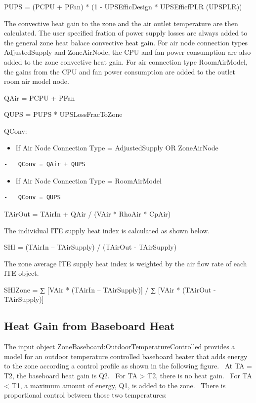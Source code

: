 PUPS = (PCPU + PFan) * (1 - UPSEfficDesign * UPSEfficfPLR (UPSPLR))

The convective heat gain to the zone and the air outlet temperature are then calculated. The user specified fration of power supply losses are always added to the general zone heat balace convective heat gain. For air node connection types AdjustedSupply and ZoneAirNode, the CPU and fan power consumption are also added to the zone convective heat gain. For air connection type RoomAirModel, the gains from the CPU and fan power consumption are added to the outlet room air model node.

QAir = PCPU + PFan

QUPS = PUPS * UPSLossFracToZone

QConv:

\begin{itemize}
\tightlist
\item
  If Air Node Connection Type = AdjustedSupply OR ZoneAirNode
\end{itemize}

\begin{lstlisting}
-   QConv = QAir + QUPS
\end{lstlisting}

\begin{itemize}
\tightlist
\item
  If Air Node Connection Type = RoomAirModel
\end{itemize}

\begin{lstlisting}
-   QConv = QUPS
\end{lstlisting}

TAirOut = TAirIn + QAir / (VAir * RhoAir * CpAir)

The individual ITE supply heat index is calculated as shown below.

SHI = (TAirIn -- TAirSupply) / (TAirOut - TAirSupply)

The zone average ITE supply heat index is weighted by the air flow rate of each ITE object.

SHIZone = ∑ {[}VAir * (TAirIn -- TAirSupply){]} / ∑ {[}VAir * (TAirOut - TAirSupply){]}

\subsection{Heat Gain from Baseboard Heat}\label{heat-gain-from-baseboard-heat}

The input object ZoneBaseboard:OutdoorTemperatureControlled provides a model for an outdoor temperature controlled baseboard heater that adds energy to the zone according a control profile as shown in the following figure.~ At TA = T2, the baseboard heat gain is Q2.~ For TA \textgreater{} T2, there is no heat gain.~ For TA \textless{} T1, a maximum amount of energy, Q1, is added to the zone.~ There is proportional control between those two temperatures:

